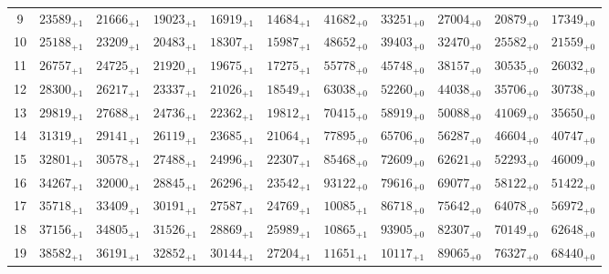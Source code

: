 \documentclass[10pt, a4paper]{article}
\begin{document}
\begin{center}
\begin{tabular}{c || c c c c c | c c c c c}
        9 & \({23589}_{+1}\) & \({21666}_{+1}\) & \({19023}_{+1}\) & \({16919}_{+1}\) & \({14684}_{+1}\) & \({41682}_{+0}\) & \({33251}_{+0}\) & \({27004}_{+0}\) & \({20879}_{+0}\) & \({17349}_{+0}\)\\
        10 & \({25188}_{+1}\) & \({23209}_{+1}\) & \({20483}_{+1}\) & \({18307}_{+1}\) & \({15987}_{+1}\) & \({48652}_{+0}\) & \({39403}_{+0}\) & \({32470}_{+0}\) & \({25582}_{+0}\) & \({21559}_{+0}\)\\
        \hline
        11 & \({26757}_{+1}\) & \({24725}_{+1}\) & \({21920}_{+1}\) & \({19675}_{+1}\) & \({17275}_{+1}\) & \({55778}_{+0}\) & \({45748}_{+0}\) & \({38157}_{+0}\) & \({30535}_{+0}\) & \({26032}_{+0}\)\\
        12 & \({28300}_{+1}\) & \({26217}_{+1}\) & \({23337}_{+1}\) & \({21026}_{+1}\) & \({18549}_{+1}\) & \({63038}_{+0}\) & \({52260}_{+0}\) & \({44038}_{+0}\) & \({35706}_{+0}\) & \({30738}_{+0}\)\\
        13 & \({29819}_{+1}\) & \({27688}_{+1}\) & \({24736}_{+1}\) & \({22362}_{+1}\) & \({19812}_{+1}\) & \({70415}_{+0}\) & \({58919}_{+0}\) & \({50088}_{+0}\) & \({41069}_{+0}\) & \({35650}_{+0}\)\\
        14 & \({31319}_{+1}\) & \({29141}_{+1}\) & \({26119}_{+1}\) & \({23685}_{+1}\) & \({21064}_{+1}\) & \({77895}_{+0}\) & \({65706}_{+0}\) & \({56287}_{+0}\) & \({46604}_{+0}\) & \({40747}_{+0}\)\\
        15 & \({32801}_{+1}\) & \({30578}_{+1}\) & \({27488}_{+1}\) & \({24996}_{+1}\) & \({22307}_{+1}\) & \({85468}_{+0}\) & \({72609}_{+0}\) & \({62621}_{+0}\) & \({52293}_{+0}\) & \({46009}_{+0}\)\\
        \hline
        16 & \({34267}_{+1}\) & \({32000}_{+1}\) & \({28845}_{+1}\) & \({26296}_{+1}\) & \({23542}_{+1}\) & \({93122}_{+0}\) & \({79616}_{+0}\) & \({69077}_{+0}\) & \({58122}_{+0}\) & \({51422}_{+0}\)\\
        17 & \({35718}_{+1}\) & \({33409}_{+1}\) & \({30191}_{+1}\) & \({27587}_{+1}\) & \({24769}_{+1}\) & \({10085}_{+1}\) & \({86718}_{+0}\) & \({75642}_{+0}\) & \({64078}_{+0}\) & \({56972}_{+0}\)\\
        18 & \({37156}_{+1}\) & \({34805}_{+1}\) & \({31526}_{+1}\) & \({28869}_{+1}\) & \({25989}_{+1}\) & \({10865}_{+1}\) & \({93905}_{+0}\) & \({82307}_{+0}\) & \({70149}_{+0}\) & \({62648}_{+0}\)\\
        19 & \({38582}_{+1}\) & \({36191}_{+1}\) & \({32852}_{+1}\) & \({30144}_{+1}\) & \({27204}_{+1}\) & \({11651}_{+1}\) & \({10117}_{+1}\) & \({89065}_{+0}\) & \({76327}_{+0}\) & \({68440}_{+0}\)\\

\end{tabular}
\end{center}
\end{document}
